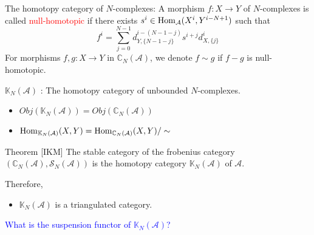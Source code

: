 \documentclass[t,ignorenonframetext]{beamer}
\newcommand{\lrt}{\longrightarrow}
\newcommand{\CA}{\mathcal{A} }
\newcommand{\C}{\mathbb{C} }
\newcommand{\K}{\mathbb{K} }
\newcommand{\Z}{\mathbb{Z} }
\newcommand{\Hom}{{\rm{Hom}}}
\begin{document}
\begin{frame}{The homotopy category of $N$-complexes:}
\pause
A morphism $f:X \longrightarrow Y$ of $N$-complexes is called \textcolor{red}{null-homotopic} if there exists $s^i \in \Hom_{\CA}(X^i,Y^{i-N+1})$ such that
\pause
\[ f^i=\sum_{j=0}^{N-1} d_{Y, \lbrace N-1-j\rbrace}^{i-(N-1-j)}s^{i+j}d^{i}_{X, \lbrace j\rbrace}\]
\pause
For morphisms $f,g:X\lrt Y$ in $\C_N(\CA)$, we denote $f\sim g$ if $f-g$ is null-homotopic.
\pause

\vspace{0.3cm}
$\K_N(\CA)$ : The homotopy category of unbounded $N$-complexes.
\begin{itemize}
\item $Obj(\K_N(\CA))=Obj(\C_N(\CA))$
\item $\Hom_{\K_N(\CA)}(X,Y)=\Hom_{\C_N(\CA)}(X,Y)/\sim$
\end{itemize}

\end{frame}

\begin{frame}
\begin{block}{Theorem [IKM]}
The stable category of the frobenius category $(\C_N(\CA),\mathcal{S}_N(\CA))$
is the homotopy category $\K_N(\CA)$ of $\CA$.
\end{block}
\pause
Therefore, 
\pause

\vspace{0.3cm}
\begin{itemize}
\item $\K_N(\CA)$ is a triangulated category.
\end{itemize}
\pause

\vspace{0.3cm}
\textcolor{blue}{What is the suspension functor of $\K_N(\CA)$?}
\end{frame}
\end{document}
